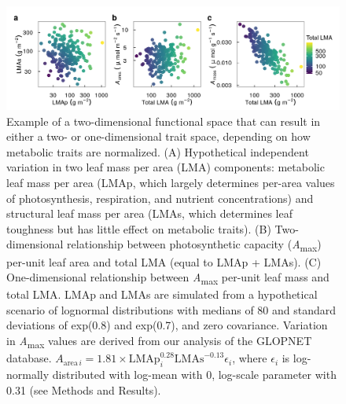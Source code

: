 \documentclass[
  12pt,
  a4paper,
,tablecaptionabove
]{scrartcl}
\begin{document}
\begin{figure}
\hypertarget{fig:Hplt}{%
\centering
\includegraphics{../figs/hypo.png}
\caption{Example of a two-dimensional functional space that can result in either a two- or one-dimensional trait space, depending on how metabolic traits are normalized. (A) Hypothetical independent variation in two leaf mass per area (LMA) components: metabolic leaf mass per area (LMAp, which largely determines per-area values of photosynthesis, respiration, and nutrient concentrations) and structural leaf mass per area (LMAs, which determines leaf toughness but has little effect on metabolic traits).
(B) Two-dimensional relationship between photosynthetic capacity (\emph{A}\textsubscript{max}) per-unit leaf area and total LMA (equal to LMAp + LMAs).
(C) One-dimensional relationship between \emph{A}\textsubscript{max} per-unit leaf mass and total LMA.
LMAp and LMAs are simulated from a hypothetical scenario of lognormal distributions with medians of 80 and standard deviations of exp(0.8) and exp(0.7), and zero covariance.
Variation in \emph{A}\textsubscript{max} values are derived from our analysis of the GLOPNET database. \(A_{\mathrm{area} \, i}=1.81 \times \mathrm{LMAp}_i^{0.28}\mathrm{LMAs}^{-0.13}\epsilon_i\), where \(\epsilon_i\) is log-normally distributed with log-mean with 0, log-scale parameter with 0.31 (see Methods and Results).}\label{fig:Hplt}
}
\end{figure}
\end{document}
